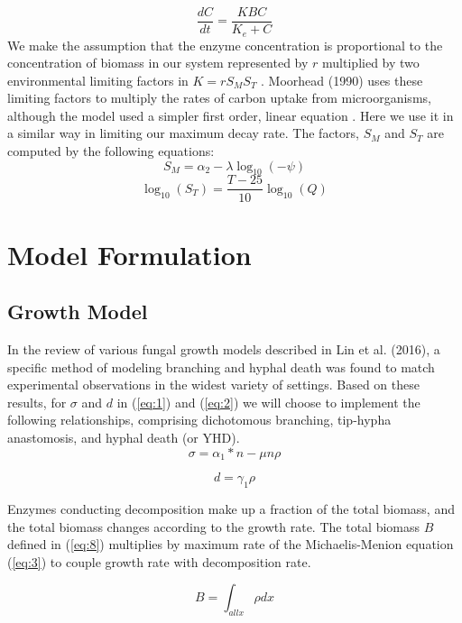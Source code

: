 \documentclass[12pt]{article}
\begin{document}
\begin{multicols}{2}
\begin{equation} \label{eq:3}
\frac{dC}{dt} = \frac{KBC}{K_{e}+C}
\end{equation}
We make the assumption that the enzyme concentration is proportional to the concentration of biomass in our system represented by $r$ multiplied by two environmental limiting factors in $K=rS_{M}S_{T}$ \cite{Schimel2003}. Moorhead (1990) uses these limiting factors to multiply the rates of carbon uptake from microorganisms, although the model used a simpler first order, linear equation \cite{Moorhead2006}. Here we use it in a similar way in limiting our maximum decay rate. The factors, $S_{M}$ and $S_{T}$ are computed by the following equations:
\begin{equation}
S_{M}=\alpha_{2} - \lambda \log_{10}(-\psi)
\end{equation}
\begin{equation}
\log_{10}(S_T) = \frac{T-25}{10}\log_{10}(Q)
\end{equation}
\pagebreak
\section{Model Formulation}


\subsection{Growth Model}
In the review of various fungal growth models described in Lin et al. (2016), a specific method of modeling branching and hyphal death was found to match experimental observations in the widest variety of settings. Based on these results, for $\sigma$ and $d$ in (\ref{eq:1}) and (\ref{eq:2}) we will choose to implement the following relationships, comprising dichotomous branching, tip-hypha anastomosis, and hyphal death (or YHD). 
\begin{equation} 
\sigma = \alpha_{1}*n - \mu n \rho
\end{equation}

\begin{equation}
d = \gamma_{1}\rho
\end{equation}

Enzymes conducting decomposition make up a fraction of the total biomass, and the total biomass changes according to the growth rate. The total biomass $B$ defined in (\ref{eq:8}) multiplies by maximum rate of the Michaelis-Menion equation (\ref{eq:3}) to couple growth rate with decomposition rate. 

\begin{equation} \label {eq:8}
B = \int_{all x}\rho dx
\end{equation}


\end{multicols}
\end{document}
